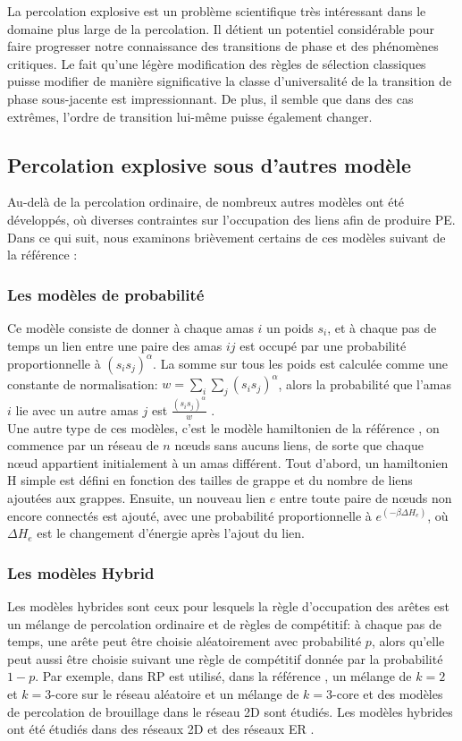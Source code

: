  La percolation explosive est un problème scientifique très intéressant dans le domaine plus large de la percolation. Il détient un potentiel considérable pour faire progresser notre connaissance des transitions de phase et des phénomènes critiques. Le fait qu'une légère modification des règles de sélection classiques puisse modifier de manière significative la classe d'universalité de la transition de phase sous-jacente est impressionnant. De plus, il semble que dans des cas extrêmes, l'ordre de transition lui-même puisse également changer.

\subsection{Percolation explosive sous d'autres modèle}

Au-delà de la percolation ordinaire, de nombreux autres modèles ont été développés, où diverses contraintes sur l'occupation des liens afin de produire PE. Dans ce qui suit, nous examinons brièvement certains de ces modèles suivant de la référence \cite{Boccaletti-al2016}: 
\subsubsection{Les modèles de probabilité}
Ce modèle consiste de donner à chaque amas $i$ un poids $s_i$, et à chaque pas de temps un lien entre une paire des amas $ij$ est occupé par une probabilité proportionnelle à $(s_is_j)^{\alpha}$. La somme sur tous les poids est calculée comme une constante de normalisation: $w=\sum_i\sum_j(s_is_j)^{\alpha}$, alors la probabilité que l'amas $i$ lie avec un autre amas $j$ est $\frac{(s_is_j)^{\alpha}}{w}$ \cite{Cho-al2010}.\\ Une autre type de ces modèles, c'est le modèle hamiltonien de la référence \cite{Moreira-al2010}, on commence par un réseau de $n$ nœuds sans aucuns liens, de sorte que chaque nœud appartient initialement à un amas différent. Tout d'abord, un hamiltonien H simple est défini en fonction des tailles de grappe et du nombre de liens ajoutées aux grappes. Ensuite, un nouveau lien $e$ entre toute paire de nœuds non encore connectés est ajouté, avec une probabilité proportionnelle à $e^{(-\beta\Delta H_e)}$, où $\Delta H_e$ est le changement d'énergie après l'ajout du lien.

\subsubsection{Les modèles Hybrid}
Les modèles hybrides sont ceux pour lesquels la règle d'occupation des arêtes est un mélange de percolation ordinaire et de règles de compétitif: à chaque pas de temps, une arête peut être choisie aléatoirement avec probabilité $p$, alors qu'elle peut aussi être choisie suivant une règle de compétitif donnée par la probabilité $1-p$. Par exemple, dans \cite{Bastas-al2014} RP est utilisé, dans la référence \cite{Cao-Schwarz2012}, un mélange de $k=2$ et $k=3$-core sur le réseau aléatoire et un mélange de $k=3$-core et des modèles de percolation de brouillage dans le réseau 2D sont étudiés. Les modèles hybrides ont été étudiés dans des réseaux 2D \cite{Cao-Schwarz2012,Bastas-al2014} et des réseaux ER  \cite{Cao-Schwarz2012,Bastas-al2014,Fan-al2012}.
